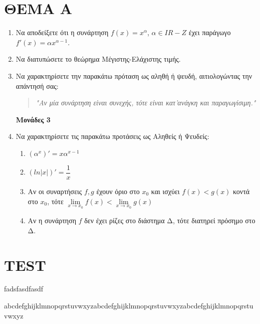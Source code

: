 \documentclass[12pt,a4paper,notitlepage]{article}
\renewcommand{\mathbb}[1]{I\!#1}
\begin{document}
		\section{ΘΕΜΑ Α}
		\begin{enumerate}[label=\textbf{\color{magenta}\thesection\greekalpha*)}]
			\item Να αποδείξετε ότι η συνάρτηση $f(x)=x^α$, $α\in\mathbb{R-Z}$ έχει παράγωγο $f'(x)=α x^{α-1}$. 
			
			\item Να διατυπώσετε το θεώρημα Μέγιστης-Ελάχιστης τιμής.
			
			\item Να χαρακτηρίσετε την παρακάτω πρόταση ως αληθή ή ψευδή, αιτιολογώντας την απάντησή σας:
			
			\begin{quote}
				\textit{"Αν μία συνάρτηση είναι συνεχής, τότε είναι κατ'ανάγκη και παραγωγίσιμη."}  
			\end{quote}
			\strut \hfill \textbf{Μονάδες 3}
			
			\item Να χαρακτηρίσετε τις παρακάτω προτάσεις ως Αληθείς ή Ψευδείς:	
			\begin{enumerate}[label=\greekalpha*)]
				\item $(α^x)'=x α^{x-1}$
				
				\item	$(ln|x|)'=\dfrac{1}{x}$
				
				\item Αν οι συναρτήσεις $f,g$ έχουν όριο στο $x_0$ και ισχύει $f(x)< g(x)$ κοντά στο $x_0$, τότε $\lim\limits_{x\to x_0}f(x)<\lim\limits_{x\to x_0}g(x)$
				
				\item Αν η συνάρτηση $f$ δεν έχει ρίζες στο διάστημα Δ, τότε διατηρεί πρόσημο στο Δ.
			\end{enumerate}
			
		\end{enumerate}
	
	\section{\color{mybluecolour} TEST}
		\color{mybluecolour} 
	fadsfasdfasdf
	
abcdefghijklmnopqrstuvwxyzabcdefghijklmnopqrstuvwxyzabcdefghijklmnopqrstuvwxyz
\end{document}
